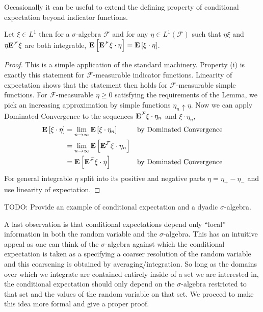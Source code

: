Occasionally it can be useful to extend the defining property of
conditional expectation beyond indicator functions.
\begin{lem}Let $\xi \in L^1$ then for a $\sigma$-algebra $\mathcal{F}$
  and for any $\eta \in L^1(\mathcal{F})$ such that $\eta \xi$ and
  $\eta \textbf{E}^{\mathcal{F}} \xi$ are both integrable, 
  $\textbf{E}\left[\textbf{E}^{\mathcal{F}} \xi\cdot\eta\right] = \textbf{E}\left[\xi\cdot\eta\right] $.
\end{lem}
\begin{proof}
This is a simple application of the standard machinery.
Property (i) is exactly this statement for $\mathcal{F}$-measurable indicator functions.
Linearity of expectation shows that the statement then holds for
$\mathcal{F}$-measurable simple functions.  For
$\mathcal{F}$-measurable $\eta \geq 0$ satisfying the requirements of
the Lemma, we pick an increasing
approximation by simple functions $\eta_n \uparrow \eta$.
Now we can
apply Dominated Convergence to the sequences
$\textbf{E}^{\mathcal{F}} \xi \cdot \eta_n$ and $\xi \cdot \eta_n$,
\begin{align*}
\textbf{E}\left[\xi \cdot \eta\right] &= \lim_{n \to \infty} \textbf{E}\left[\xi
  \cdot \eta_n\right] & & \text{by Dominated Convergence} \\
&=\lim_{n \to \infty} \textbf{E}\left[\textbf{E}^{\mathcal{F}} \xi 
  \cdot \eta_n\right] \\
&=\textbf{E}\left[\textbf{E}^{\mathcal{F}} \xi 
  \cdot \eta\right] & & \text{by Dominated Convergence} \\
\end{align*}
For general integrable $\eta$ split into its positive and negative
parts $\eta = \eta_+ - \eta_-$ and use linearity of expectation.
\end{proof}

TODO: Provide an example of conditional expectation and a dyadic
$\sigma$-algebra.

A last observation is that conditional expectations depend only 
``local'' information in both the random variable and the
$\sigma$-algebra.  This has an intuitive appeal as one can think of
the $\sigma$-algebra against which the conditional expectation is
taken as a specifying a coarser resolution of the random variable and
this coarsening is obtained by averaging/integration.  So long as the
domains over which we integrate are contained entirely inside of a
set we are interested in, the conditional expectation should only
depend on the $\sigma$-algebra restricted to that set and the values
of the random variable on that set.  We proceed to make this idea more
formal and give a proper proof.

